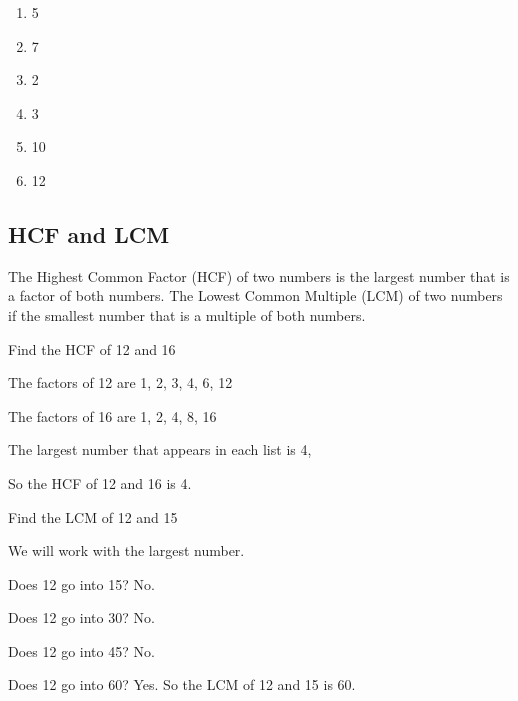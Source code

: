 \begin{enumerate}
	\item 5
	\item 7
	\item 2
	\item 3
	\item 10
	\item 12
\end{enumerate}
\subsection{HCF and LCM}
The Highest Common Factor (HCF) of two numbers is the largest number that is a factor of both numbers.  The Lowest Common Multiple (LCM) of two numbers if the smallest number that is a multiple of both numbers.
\begin{exmp}
Find the HCF of 12 and 16

The factors of 12 are 1, 2, 3, 4, 6, 12

The factors of 16 are 1, 2, 4, 8, 16

The largest number that appears in each list is 4,

So the HCF of 12 and 16 is 4.
\end{exmp}
\begin{exmp}
Find the LCM of 12 and 15

We will work with the largest number.

Does 12 go into 15? No.

Does 12 go into 30? No.

Does 12 go into 45? No.

Does 12 go into 60? Yes.  So the LCM of 12 and 15 is 60.
\end{exmp}
